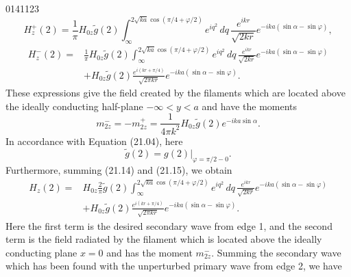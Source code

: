 \begin{scanpage}{0141}{123}
\[
H_z^+(2)=\frac1\pi H_{0z}\widetilde g(2)\int_\infty^{2\sqrt{ka}\cos(\pi/4+\varphi/2)}e^{iq^2}\,dq\,\frac{e^{ikr}}{\sqrt{2kr}}e^{-ika(\sin\alpha-\sin\varphi)},\tag{21.14}
\]
\[
\begin{aligned}H_z^-(2)={}&\frac1\pi H_{0z}\widetilde g(2)\int_\infty^{2\sqrt{ka}\cos(\pi/4+\varphi/2)}e^{iq^2}\,dq\,\frac{e^{ikr}}{\sqrt{2kr}}e^{-ika(\sin\alpha-\sin\varphi)}\\
&+H_{0z}\widetilde g(2)\frac{e^{i(kr+\pi/4)}}{\sqrt{2\pi kr}}e^{-ika(\sin\alpha-\sin\varphi)}.
\end{aligned}\tag{21.15}
\]
These expressions give the field created by the filaments which are located above the ideally conducting half-plane $-\infty<y<a$ and have the moments
\[
m_{2z}^-=-m_{2z}^+=\frac1{4\pi k^2}H_{0z}\widetilde g(2)e^{-ika\sin\alpha}.\tag{21.16}
\]
In accordance with Equation (21.04), here
\[
\widetilde g(2)=g(2)\big|_{\varphi=\pi/2-0}.\tag{21.17}
\]
Furthermore, summing (21.14) and (21.15), we obtain
\[
\begin{aligned}H_z(2)={}&H_{0z}\frac2\pi\widetilde g(2)\int_\infty^{2\sqrt{ka}\cos(\pi/4+\varphi/2)}e^{iq^2}\,dq\,\frac{e^{ikr}}{\sqrt{2kr}}e^{-ika(\sin\alpha-\sin\varphi)}\\
&+H_{0z}\widetilde g(2)\frac{e^{i(kr+\pi/4)}}{\sqrt{2\pi kr}}e^{-ika(\sin\alpha-\sin\varphi)}.
\end{aligned}\tag{21.18}
\]
Here the first term is the desired secondary wave from edge 1, and the second term is the field radiated by the filament which is located above the ideally conducting plane $x=0$ and has the moment $m_{2z}^-$. Summing the secondary wave which has been found with the unperturbed primary wave from edge 2, we have
\end{scanpage}
